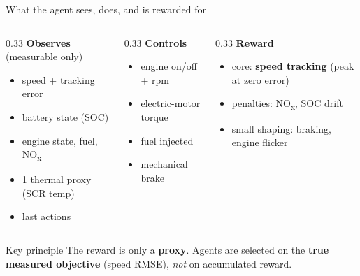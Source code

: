 \documentclass[aspectratio=169,11pt]{beamer}
\newcommand{\NOx}{NO\textsubscript{x}}
\newcommand{\keyword}[1]{\textcolor{tugreen}{\textbf{#1}}}
\begin{document}
\begin{frame}{What the agent sees, does, and is rewarded for}
  \begin{columns}[T]
    \begin{column}{0.33\textwidth}
      \textbf{Observes} \footnotesize(measurable only)
      \begin{itemize}\footnotesize
        \item speed + tracking error
        \item battery state (SOC)
        \item engine state, fuel, \NOx{}
        \item 1 thermal proxy (SCR temp)
        \item last actions
      \end{itemize}
    \end{column}
    \begin{column}{0.33\textwidth}
      \textbf{Controls}
      \begin{itemize}\footnotesize
        \item engine on/off + rpm
        \item electric-motor torque
        \item fuel injected
        \item mechanical brake
      \end{itemize}
    \end{column}
    \begin{column}{0.33\textwidth}
      \textbf{Reward}
      \begin{itemize}\footnotesize
        \item core: \keyword{speed tracking} (peak at zero error)
        \item penalties: \NOx{}, SOC drift
        \item small shaping: braking, engine flicker
      \end{itemize}
    \end{column}
  \end{columns}
  \vspace{0.8em}
  \begin{block}{Key principle}
    The reward is only a \keyword{proxy}. Agents are selected on the \keyword{true measured objective} (speed RMSE), \emph{not} on accumulated reward.
  \end{block}
\end{frame}
\end{document}
